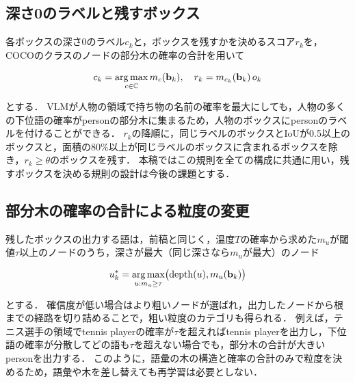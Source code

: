 \subsection{深さ0のラベルと残すボックス}
各ボックスの深さ0のラベル$ c_k $と，ボックスを残すかを決めるスコア$ r_k $を，COCOのクラスのノードの部分木の確率の合計を用いて

\begin{equation}
    c_k = \operatorname*{arg\,max}_{c \in {\mathbb C}} m_c({\mathbf b}_k), \quad r_k = m_{c_k}({\mathbf b}_k) \, o_k
    \label{eq_score}
\end{equation}

\noindent
とする．
VLMが人物の領域で持ち物の名前の確率を最大にしても，人物の多くの下位語の確率がpersonの部分木に集まるため，人物のボックスにpersonのラベルを付けることができる．
$ r_k $の降順に，同じラベルのボックスとIoUが0.5以上のボックスと，面積の80\%以上が同じラベルのボックスに含まれるボックスを除き，$ r_k \geq \theta $のボックスを残す．
本稿ではこの規則を全ての構成に共通に用い，残すボックスを決める規則の設計は今後の課題とする．

\subsection{部分木の確率の合計による粒度の変更}
残したボックスの出力する語は，前稿\cite{ref_prevVG}と同じく，温度$ T $の確率から求めた$ m_u $が閾値$ \tau $以上のノードのうち，深さが最大（同じ深さなら$ m_u $が最大）のノード

\begin{equation}
    u^{*}_k = \operatorname*{arg\,max}_{u: m_u \geq \tau} \bigl(\mathrm{depth}(u), m_u({\mathbf b}_k)\bigr)
    \label{eq_output}
\end{equation}

\noindent
とする．
確信度が低い場合はより粗いノードが選ばれ，出力したノードから根までの経路を切り詰めることで，粗い粒度のカテゴリも得られる．
例えば，テニス選手の領域でtennis playerの確率が$ \tau $を超えればtennis playerを出力し，下位語の確率が分散してどの語も$ \tau $を超えない場合でも，部分木の合計が大きいpersonを出力する．
このように，語彙の木の構造と確率の合計のみで粒度を決めるため，語彙や木を差し替えても再学習は必要としない．
